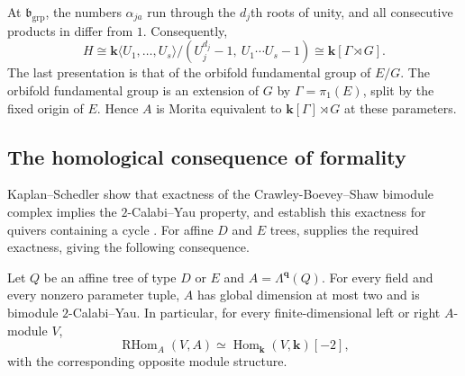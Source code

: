 \documentclass[a4paper]{amsart}
\newcommand{\kk}{\mathbf{k}}
\numberwithin{equation}{section}
\begin{document}
At $\mathfrak b_{\mathrm{grp}}$, the numbers $\alpha_{ja}$ run
through the $d_j$th roots of unity, and all consecutive products
in  differ from $1$. Consequently,
\begin{equation}\label{eq:star-group-corner}
 H\cong
 \kk\langle U_1,\ldots,U_s\rangle/
 (U_j^{d_j}-1,\ U_1\cdots U_s-1)
 \cong\kk[\Gamma\rtimes G].
\end{equation}
The last presentation is that of the orbifold fundamental group
of $E/G$. The orbifold fundamental group is an extension of $G$
by $\Gamma=\pi_1(E)$, split by the fixed origin of $E$.
Hence $A$ is Morita equivalent to
$\kk[\Gamma]\rtimes G$ at these parameters.

\subsection{The homological consequence of formality}

Kaplan--Schedler show that exactness of the Crawley-Boevey--Shaw
bimodule complex implies the $2$-Calabi--Yau property, and establish
this exactness for quivers containing a cycle
\cite[Corollaries~3.19 and~3.20]{KS}. For affine $D$ and $E$ trees,
 supplies the required exactness, giving
the following consequence.

\begin{lemma}\label{lem:star-cy}
Let $Q$ be an affine tree of type $D$ or $E$ and $A=\Lambda^{\boldsymbol q}(Q)$.
For every field and every nonzero parameter tuple, $A$ has global
dimension at most two and is bimodule $2$-Calabi--Yau. In
particular, for every finite-dimensional left or right $A$-module
$V$,
\begin{equation}\label{eq:star-finite-duality}
 \operatorname{RHom}_A(V,A)
 \simeq\operatorname{Hom}_{\kk}(V,\kk)[-2],
\end{equation}
with the corresponding opposite module structure.
\end{lemma}
\end{document}
